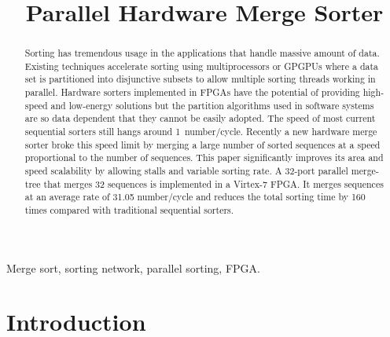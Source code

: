\documentclass[10pt, conference]{IEEEtran}
\begin{document}
\title{Parallel Hardware Merge Sorter}


\author{
}

\maketitle

\begin{abstract}

Sorting has tremendous usage in the applications that handle massive amount of data.
Existing techniques accelerate sorting using multiprocessors or GPGPUs where a data set is partitioned into disjunctive subsets to allow multiple sorting threads working in parallel.
Hardware sorters implemented in FPGAs have the potential of providing high-speed and low-energy solutions
but the partition algorithms used in software systems are so data dependent that they cannot be easily adopted.
The speed of most current sequential sorters still hangs around 1~number/cycle.
Recently a new hardware merge sorter broke this speed limit by merging a large number of sorted sequences at a speed proportional to the number of sequences.
This paper significantly improves its area and speed scalability by allowing stalls and variable sorting rate.
A 32-port parallel merge-tree that merges 32 sequences is implemented in a Virtex-7 FPGA.
It merges sequences at an average rate of 31.05 number/cycle and reduces the total sorting time by 160 times compared with traditional sequential sorters.

\end{abstract}

\begin{IEEEkeywords}
Merge sort, sorting network, parallel sorting, FPGA.
\end{IEEEkeywords}


\section{Introduction}
\end{document}
